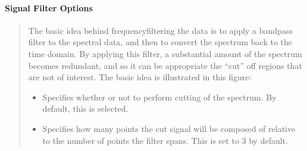 \documentclass[letterpaper,10pt,english]{sphinxmanual}
\begin{document}
\paragraph{Signal Filter Options}
\label{\detokenize{gui/usage/setup:signal-filter-options}}\begin{quote}

\sphinxAtStartPar
The basic idea behind frequency\sphinxhyphen{}filtering the data is to apply a band\sphinxhyphen{}pass
filter to the spectral data, and then to convert the spectrum back to the
time domain. By applying this filter, a substantial amount of the spectrum
becomes redundant, and so it can be appropriate the “cut” off regions that are
not of interest. The basic idea is illustrated in this figure:

\begin{itemize}
\item {} 
\sphinxAtStartPar
{} \sphinxhyphen{} Specifies whether or not to perform cutting of the spectrum.
By default, this is selected.

\item {} 
\sphinxAtStartPar
{} \sphinxhyphen{} Specifies how many points the cut signal
will be composed of relative to the number of points the filter spans. This
is set to 3 by default.

\end{itemize}
\end{quote}
\end{document}
